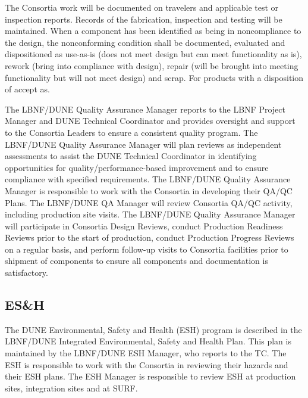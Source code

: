 The Consortia work will be documented on travelers and applicable test
or inspection reports. Records of the fabrication, inspection and
testing will be maintained. When a component has been identified as
being in noncompliance to the design, the nonconforming condition
shall be documented, evaluated and dispositioned as use-as-is (does
not meet design but can meet functionality as is), rework (bring into
compliance with design), repair (will be brought into meeting
functionality but will not meet design) and scrap. For products with a
disposition of accept as.

The LBNF/DUNE Quality Assurance Manager reports to the LBNF Project
Manager and DUNE Technical Coordinator and provides oversight and
support to the Consortia Leaders to ensure a consistent quality
program. The LBNF/DUNE Quality Assurance Manager will plan reviews as
independent assessments to assist the DUNE Technical Coordinator in
identifying opportunities for quality/performance-based improvement
and to ensure compliance with specified requirements. The LBNF/DUNE
Quality Assurance Manager is responsible to work with the Consortia in
developing their QA/QC Plans. The LBNF/DUNE QA Manager will review
Consortia QA/QC activity, including production site visits.  The
LBNF/DUNE Quality Assurance Manager will participate in Consortia
Design Reviews, conduct Production Readiness Reviews prior to the
start of production, conduct Production Progress Reviews on a regular
basis, and perform follow-up visits to Consortia facilities prior to
shipment of components to ensure all components and documentation is
satisfactory.


\subsection{ES\&H}
\label{sec:fdsp-coord-esh}

The DUNE Environmental, Safety and Health (ESH) program is described
in the LBNF/DUNE Integrated Environmental, Safety and Health
Plan. This plan is maintained by the LBNF/DUNE ESH Manager, who
reports to the TC. The ESH is responsible to work with the Consortia
in reviewing their hazards and their ESH plans.  The ESH Manager is
responsible to review ESH at production sites, integration sites and
at SURF.



